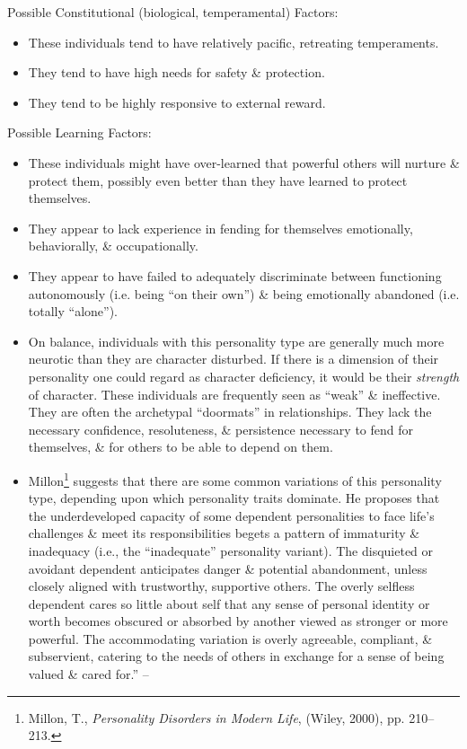 \documentclass{article}
\numberwithin{equation}{section}
\begin{document}
Possible Constitutional (biological, temperamental) Factors:
\begin{itemize}
	\item These individuals tend to have relatively pacific, retreating temperaments.
	\item They tend to have high needs for safety \& protection.
	\item They tend to be highly responsive to external reward.
\end{itemize}
Possible Learning Factors:
\begin{itemize}
	\item These individuals might have over-learned that powerful others will nurture \& protect them, possibly even better than they have learned to protect themselves.
	\item They appear to lack experience in fending for themselves emotionally, behaviorally, \& occupationally.
	\item They appear to have failed to adequately discriminate between functioning autonomously (i.e. being ``on their own'') \& being emotionally abandoned (i.e. totally ``alone'').
	\item On balance, individuals with this personality type are generally much more neurotic than they are character disturbed. If there is a dimension of their personality one could regard as character deficiency, it would be their \textit{strength} of character. These individuals are frequently seen as ``weak'' \& ineffective. They are often the archetypal ``doormats'' in relationships. They lack the necessary confidence, resoluteness, \& persistence necessary to fend for themselves, \& for others to be able to depend on them.
	\item Millon\footnote{Millon, T., \textit{Personality Disorders in Modern Life}, (Wiley, 2000), pp. 210--213.} suggests that there are some common variations of this personality type, depending upon which personality traits dominate. He proposes that the underdeveloped capacity of some dependent personalities to face life's challenges \& meet its responsibilities begets a pattern of immaturity \& inadequacy (i.e., the ``inadequate'' personality variant). The disquieted or avoidant dependent anticipates danger \& potential abandonment, unless closely aligned with trustworthy, supportive others. The overly selfless dependent cares so little about self that any sense of personal identity or worth becomes obscured or absorbed by another viewed as stronger or more powerful. The accommodating variation is overly agreeable, compliant, \& subservient, catering to the needs of others in exchange for a sense of being valued \& cared for.'' -- \cite[pp. 56--59]{Simon2011}
\end{itemize}
\end{document}
